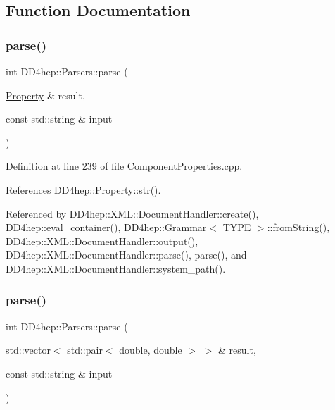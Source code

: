 \subsection{Function Documentation}
\hypertarget{namespace_d_d4hep_1_1_parsers_a49cf20eb52b8e48550d6e3f74b94069e}{}\label{namespace_d_d4hep_1_1_parsers_a49cf20eb52b8e48550d6e3f74b94069e} 
\subsubsection{\texorpdfstring{parse()}{parse()}\hspace{0.1cm}{\footnotesize\ttfamily [1/21]}}
{\footnotesize\ttfamily int D\+D4hep\+::\+Parsers\+::parse (\begin{DoxyParamCaption}\item[{\hyperlink{class_d_d4hep_1_1_property}{Property} \&}]{result,  }\item[{const std\+::string \&}]{input }\end{DoxyParamCaption})}



Definition at line 239 of file Component\+Properties.\+cpp.



References D\+D4hep\+::\+Property\+::str().



Referenced by D\+D4hep\+::\+X\+M\+L\+::\+Document\+Handler\+::create(), D\+D4hep\+::eval\+\_\+container(), D\+D4hep\+::\+Grammar$<$ T\+Y\+P\+E $>$\+::from\+String(), D\+D4hep\+::\+X\+M\+L\+::\+Document\+Handler\+::output(), D\+D4hep\+::\+X\+M\+L\+::\+Document\+Handler\+::parse(), parse(), and D\+D4hep\+::\+X\+M\+L\+::\+Document\+Handler\+::system\+\_\+path().

\hypertarget{namespace_d_d4hep_1_1_parsers_ad0d0bfb1ee52c6c6fe6000325562b1fa}{}\label{namespace_d_d4hep_1_1_parsers_ad0d0bfb1ee52c6c6fe6000325562b1fa} 
\subsubsection{\texorpdfstring{parse()}{parse()}\hspace{0.1cm}{\footnotesize\ttfamily [2/21]}}
{\footnotesize\ttfamily int D\+D4hep\+::\+Parsers\+::parse (\begin{DoxyParamCaption}\item[{std\+::vector$<$ std\+::pair$<$ double, double $>$ $>$ \&}]{result,  }\item[{const std\+::string \&}]{input }\end{DoxyParamCaption})}



